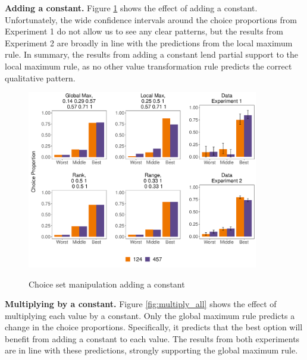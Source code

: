 \documentclass[11pt,a4paper]{article}
\begin{document}
\textbf{Adding a constant.} Figure \ref{fig:addconstant_all} shows the effect of adding a constant. Unfortunately, the wide confidence intervals around the choice proportions from Experiment 1 do not allow us to see any clear patterns, but the results from Experiment 2 are broadly in line with the predictions from the local maximum rule. In summary, the results from adding a constant lend partial support to the local maximum rule, as no other value transformation rule predicts the correct qualitative pattern.  


\begin{figure}[!htb]
\captionsetup{justification=centering}
\centering
\caption{Choice set manipulation adding a constant}
\includegraphics[width=0.9\textwidth]{addconst.pdf}
\label{fig:addconstant_all}
\end{figure}

\textbf{Multiplying by a constant.} Figure \ref{fig:multiply_all} shows the effect of multiplying each value by a constant. Only the global maximum rule predicts a change in the choice proportions. Specifically, it predicts that the best option will benefit from adding a constant to each value. The results from both experiments are in line with these predictions, strongly supporting the global maximum rule.
\end{document}
